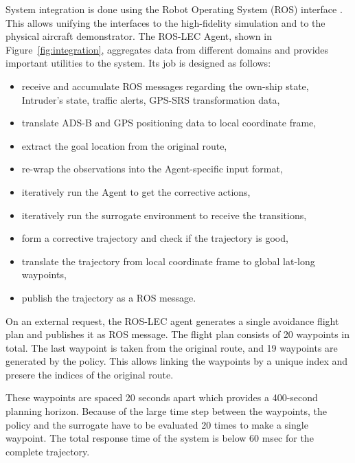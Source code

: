 System integration is done using the Robot Operating System (ROS) interface \cite{quigley2009ros}. This allows unifying the interfaces to the high-fidelity simulation and to the physical aircraft demonstrator.
The ROS-LEC Agent, shown in Figure~\ref{fig:integration}, aggregates data from different domains and provides important utilities to the system. Its job is designed as follows: 
\begin{itemize}
	\item receive and accumulate ROS messages regarding the own-ship state,
	Intruder's state, traffic alerts, GPS-SRS transformation data,
	\item translate ADS-B and GPS positioning data to local coordinate frame,
	\item extract the goal location from the original route,
	\item re-wrap the observations into the Agent-specific input format,
	\item iteratively run the Agent to get the corrective actions,
	\item iteratively run the surrogate environment to receive the transitions,
	\item form a corrective trajectory and check if the trajectory is good,
	\item translate the trajectory from local coordinate frame to global lat-long waypoints,
	\item publish the trajectory as a ROS message.
\end{itemize}

On an external request, the ROS-LEC agent generates a single avoidance flight plan and publishes it as ROS message. The flight plan consists of 20 waypoints in total. The last waypoint is taken from the original route, and 19 waypoints are generated by the policy. This allows linking the waypoints by a unique index and presere the indices of the original route.

These waypoints are spaced 20 seconds apart which provides a 400-second planning horizon. 
Because of the large time step between the waypoints, the policy and the surrogate have to be evaluated 20 times to make a single waypoint. The total response time of the system is below 60 msec for the complete trajectory.

